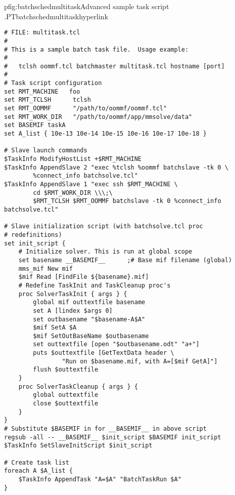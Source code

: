 \begin{codelisting}{p}{fig:batchschedmultitask}{Advanced sample task
  script .}{PTbatchschedmultitask}{hyperlink}
\begin{verbatim}
# FILE: multitask.tcl
#
# This is a sample batch task file.  Usage example:
#
#   tclsh oommf.tcl batchmaster multitask.tcl hostname [port]
#
# Task script configuration
set RMT_MACHINE   foo
set RMT_TCLSH      tclsh
set RMT_OOMMF      "/path/to/oommf/oommf.tcl"
set RMT_WORK_DIR   "/path/to/oommf/app/mmsolve/data"
set BASEMIF taskA
set A_list { 10e-13 10e-14 10e-15 10e-16 10e-17 10e-18 }

# Slave launch commands
$TaskInfo ModifyHostList +$RMT_MACHINE
$TaskInfo AppendSlave 2 "exec %tclsh %oommf batchslave -tk 0 \
        %connect_info batchsolve.tcl"
$TaskInfo AppendSlave 1 "exec ssh $RMT_MACHINE \
        cd $RMT_WORK_DIR \\\;\
        $RMT_TCLSH $RMT_OOMMF batchslave -tk 0 %connect_info batchsolve.tcl"

# Slave initialization script (with batchsolve.tcl proc
# redefinitions)
set init_script {
    # Initialize solver. This is run at global scope
    set basename __BASEMIF__      ;# Base mif filename (global)
    mms_mif New mif
    $mif Read [FindFile ${basename}.mif]
    # Redefine TaskInit and TaskCleanup proc's
    proc SolverTaskInit { args } {
        global mif outtextfile basename
        set A [lindex $args 0]
        set outbasename "$basename-A$A"
        $mif SetA $A
        $mif SetOutBaseName $outbasename
        set outtextfile [open "$outbasename.odt" "a+"]
        puts $outtextfile [GetTextData header \
                "Run on $basename.mif, with A=[$mif GetA]"]
        flush $outtextfile
    }
    proc SolverTaskCleanup { args } {
        global outtextfile
        close $outtextfile
    }
}
# Substitute $BASEMIF in for __BASEMIF__ in above script
regsub -all -- __BASEMIF__ $init_script $BASEMIF init_script
$TaskInfo SetSlaveInitScript $init_script

# Create task list
foreach A $A_list {
    $TaskInfo AppendTask "A=$A" "BatchTaskRun $A"
}
\end{verbatim}
\end{codelisting}

\setcounter{secnumdepth}{\value{msoldsecnumdepth}}
